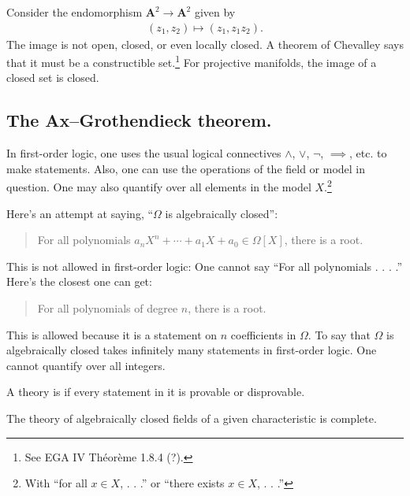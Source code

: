\documentclass [11 pt, oneside] {article}
\begin{document}
\begin{example}\label{}
Consider the endomorphism $\mathbf{A}^2\longrightarrow \mathbf{A}^2$ given by
\begin{align*}
	(z_1,z_2)\longmapsto  (z_1,z_1z_2).
\end{align*}
The image is not open, closed, or even locally closed. A theorem of Chevalley says that it must be a constructible set.\footnote{See EGA IV Th\'eor\`eme 1.8.4 (?).} For projective manifolds, the image of a closed set is closed.
\end{example}

\subsection{The Ax--Grothendieck theorem.}
\begin{remark}
 In first-order logic, one uses the usual logical connectives $\land$, $\lor$, $\lnot$, ${\implies}$, etc. to make statements. Also, one can use the operations of the field or model in question. One may also quantify over all elements in the model $X$.\footnote{With ``for all $x\in X$, . . .'' or ``there exists $x\in X$, . . .''}

	Here's an attempt at saying, ``$\Omega$ is algebraically closed'':
	\begin{quote}
		\small 
		For all polynomials $a_nX^n + \cdots + a_1X + a_0\in \Omega[X]$, there is a root.
	\end{quote}
	This is not allowed in first-order logic: One cannot say ``For all polynomials . . . .'' Here's the closest one can get:
	\begin{quote}
		\small 
		For all polynomials of degree $n$, there is a root.
	\end{quote}
	This is allowed because it is a statement on $n$ coefficients in $\Omega$. To say that $\Omega$ is algebraically closed takes infinitely many statements in first-order logic. One cannot quantify over all integers.
\end{remark}
\begin{definition}[ ]\label{}
A theory is  if every statement in it is provable or disprovable.
\end{definition}

\begin{proposition}[ ]\label{}
The theory of algebraically closed fields of a given characteristic is complete.
\end{proposition}
\end{document}
